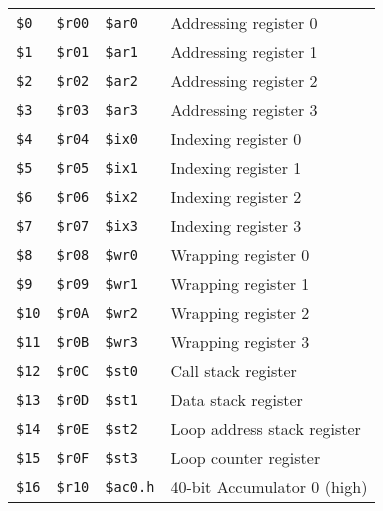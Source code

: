 \documentclass[oneside,english,a4paper,10pt,oneside,openany,final]{memoir}
\newcommand{\Register}[1]{\texttt{#1}}
\begin{document}
\begin{table}[htb]
\centering
\begin{tabular}{|l|l|l|l|}
\hline
                &                  &                      &                             \\ \hline
\Register{\$0}  & \Register{\$r00} & \Register{\$ar0}     & Addressing register 0       \\ \hline
\Register{\$1}  & \Register{\$r01} & \Register{\$ar1}     & Addressing register 1       \\ \hline
\Register{\$2}  & \Register{\$r02} & \Register{\$ar2}     & Addressing register 2       \\ \hline
\Register{\$3}  & \Register{\$r03} & \Register{\$ar3}     & Addressing register 3       \\ \hline
\Register{\$4}  & \Register{\$r04} & \Register{\$ix0}     & Indexing register 0         \\ \hline
\Register{\$5}  & \Register{\$r05} & \Register{\$ix1}     & Indexing register 1         \\ \hline
\Register{\$6}  & \Register{\$r06} & \Register{\$ix2}     & Indexing register 2         \\ \hline
\Register{\$7}  & \Register{\$r07} & \Register{\$ix3}     & Indexing register 3         \\ \hline
\Register{\$8}  & \Register{\$r08} & \Register{\$wr0}     & Wrapping register 0         \\ \hline
\Register{\$9}  & \Register{\$r09} & \Register{\$wr1}     & Wrapping register 1         \\ \hline
\Register{\$10} & \Register{\$r0A} & \Register{\$wr2}     & Wrapping register 2         \\ \hline
\Register{\$11} & \Register{\$r0B} & \Register{\$wr3}     & Wrapping register 3         \\ \hline
\Register{\$12} & \Register{\$r0C} & \Register{\$st0}     & Call stack register         \\ \hline
\Register{\$13} & \Register{\$r0D} & \Register{\$st1}     & Data stack register         \\ \hline
\Register{\$14} & \Register{\$r0E} & \Register{\$st2}     & Loop address stack register \\ \hline
\Register{\$15} & \Register{\$r0F} & \Register{\$st3}     & Loop counter register       \\ \hline
\Register{\$16} & \Register{\$r10} & \Register{\$ac0.h}   & 40-bit Accumulator 0 (high) \\ \hline

\end{tabular}
\end{table}
\end{document}
